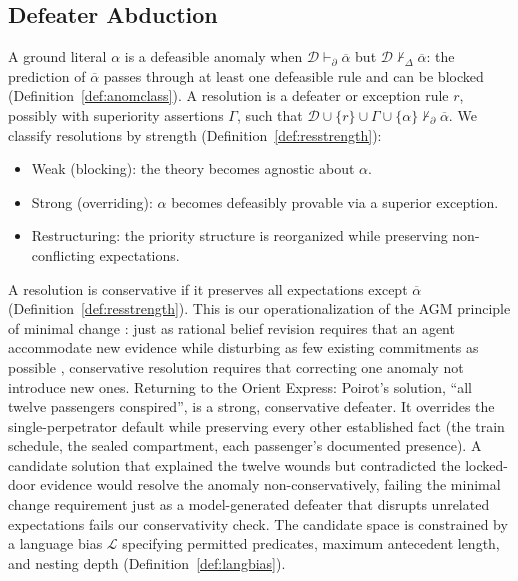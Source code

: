 \documentclass{article}
\theoremstyle{definition}
\newcommand{\D}{\mathcal{D}}
\newcommand{\La}{\mathcal{L}}
\newcommand{\pDelta}{\vdash_{\Delta}}
\newcommand{\pPartial}{\vdash_{\partial}}
\newcommand{\comp}[1]{\overline{#1}}
\begin{document}
\subsection{Defeater Abduction}\label{subsec:level3}

A ground literal $\alpha$ is a defeasible anomaly when $\D \pPartial \comp{\alpha}$ but $\D \not\pDelta \comp{\alpha}$: the prediction of $\comp{\alpha}$ passes through at least one defeasible rule and can be blocked (Definition~\ref{def:anomclass}). A resolution is a defeater or exception rule $r$, possibly with superiority assertions $\Gamma$, such that $\D \cup \{r\} \cup \Gamma \cup \{\alpha\} \not\pPartial \comp{\alpha}$. We classify resolutions by strength (Definition~\ref{def:resstrength}):

\begin{itemize}[nosep]
    \item Weak (blocking): the theory becomes agnostic about $\alpha$.
    \item Strong (overriding): $\alpha$ becomes defeasibly provable via a superior exception.
    \item Restructuring: the priority structure is reorganized while preserving non-conflicting expectations.
\end{itemize}

A resolution is conservative if it preserves all expectations except $\comp{\alpha}$ (Definition~\ref{def:resstrength}). This is our operationalization of the AGM principle of minimal change \cite{alchourron1985logic, gardenfors1988knowledge}: just as rational belief revision requires that an agent accommodate new evidence while disturbing as few existing commitments as possible \cite{katsuno1991propositional}, conservative resolution requires that correcting one anomaly not introduce new ones. Returning to the Orient Express: Poirot's solution, ``all twelve passengers conspired'', is a strong, conservative defeater. It overrides the single-perpetrator default while preserving every other established fact (the train schedule, the sealed compartment, each passenger's documented presence). A candidate solution that explained the twelve wounds but contradicted the locked-door evidence would resolve the anomaly non-conservatively, failing the minimal change requirement just as a model-generated defeater that disrupts unrelated expectations fails our conservativity check. The candidate space is constrained by a language bias $\La$ specifying permitted predicates, maximum antecedent length, and nesting depth (Definition~\ref{def:langbias}).
\end{document}
